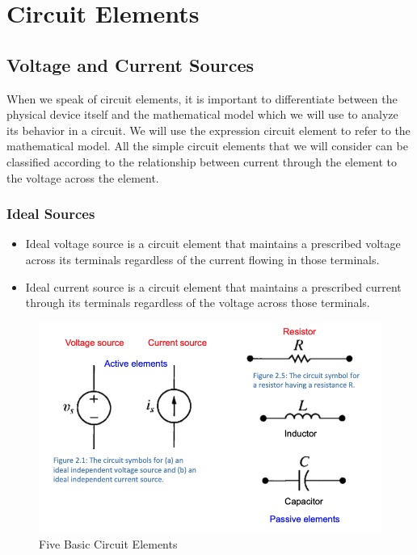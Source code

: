 \documentclass[14pt]{memoir}
\begin{document}
\chapter{Circuit Elements}

\section{Voltage and Current Sources}


When we speak of circuit elements, it is important to differentiate between the physical device itself and the mathematical model which we will use to analyze its behavior in a circuit. We will use the expression circuit element to refer to the mathematical model. All the simple circuit elements that we will consider can be classified according to the relationship between current through the element to the voltage across the element.

\subsection{Ideal Sources}
\begin{itemize}
\item Ideal voltage source is a circuit element that maintains a prescribed voltage across its terminals regardless of the current flowing in those terminals. 
\item Ideal current source is a circuit element that maintains a prescribed current through its terminals regardless of the voltage across those terminals.
\end{itemize}

\begin{figure}[h]
\begin{center}
\includegraphics[scale=0.60]{fig/fig02_01.png}
\caption{Five Basic Circuit Elements}
\label{fig:f02_01}
\end{center}
\end{figure}
\end{document}
